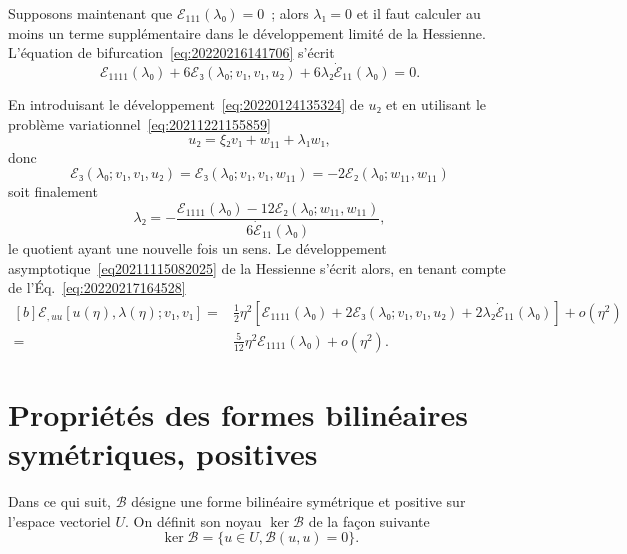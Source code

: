 \documentclass[12pt, final]{amsart}
\theoremstyle{definition}
\begin{document}
Supposons maintenant que \(ℰ_{111}(λ₀) = 0\)~; alors \(λ₁ = 0\) et il faut
calculer au moins un terme supplémentaire dans le développement limité de la
Hessienne. L'équation de bifurcation~\eqref{eq:20220216141706} s'écrit
\begin{equation}
  \label{eq:20220217164528}
  ℰ_{1111}(λ₀) + 6ℰ₃(λ₀; v₁, v₁, u₂) + 6 λ₂ \dot{ℰ}_{11}(λ₀) = 0.
\end{equation}

En introduisant le développement~\eqref{eq:20220124135324} de \(u₂\) et en
utilisant le problème variationnel~\eqref{eq:20211221155859}
\begin{equation}
 u₂ = ξ₂ v₁ + w_{11} + λ₁ w₁,
\end{equation}
donc
\begin{equation}
 ℰ₃(λ₀; v₁, v₁, u₂) = ℰ₃(λ₀; v₁, v₁, w_{11}) = - 2ℰ₂(λ₀; w_{11}, w_{11})
\end{equation}
soit finalement
\begin{equation}
  λ₂ = - \frac{ℰ_{1111}(λ₀) - 12ℰ₂(λ₀; w_{11}, w_{11})}{6\dot{ℰ}_{11}(λ₀)},
\end{equation}
le quotient ayant une nouvelle fois un sens. Le développement
asymptotique~\eqref{eq20211115082025} de la Hessienne s'écrit alors, en tenant
compte de l'Éq.~\eqref{eq:20220217164528}
\begin{equation}
  \begin{aligned}[b]
    ℰ_{, uu} [u(η), λ(η); v₁, v₁] ={}
    & \tfrac{1}{2} η^2 [ℰ_{1111}(λ₀) + 2ℰ₃(λ₀; v₁, v₁, u₂) + 2 λ₂ \dot{ℰ}_{11}(λ₀)] + o(η^2)\\
    = & \tfrac{5}{12} η^2 ℰ_{1111}(λ₀) + o(η^2).
  \end{aligned}
\end{equation}

\section{Propriétés des formes bilinéaires symétriques, positives}

Dans ce qui suit, \(\mathcal{B}\) désigne une forme bilinéaire symétrique et
positive sur l'espace vectoriel \(U\). On définit son noyau \(\ker \mathcal{B}\)
de la façon suivante
\begin{equation}
 \ker \mathcal{B}= \bigl\{ u ∈ U, \mathcal{B}(u, u) = 0 \bigr\} .
\end{equation}
\end{document}
